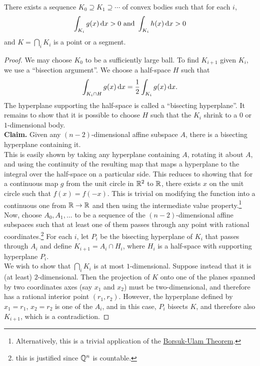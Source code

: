 \begin{lemma}
\label{localization lemma lemma 1}
	There exists a sequence $K_0\supseteq K_1 \supseteq \cdots$ of convex bodies such that for each $i$,
	\[ \int_{K_i} g(x)\operatorname{d}\!{x} > 0 \text{ and } \int_{K_i} h(x)\operatorname{d}\!{x} > 0 \]
	and $K=\bigcap_i K_i$ is a point or a segment.
\end{lemma}
\begin{proof}
	We may choose $K_0$ to be a sufficiently large ball. To find $K_{i+1}$ given $K_i$, we use a ``bisection argument''. We choose a half-space $H$ such that
	\[ \int_{K_i\cap H} g(x)\operatorname{d}\!{x} = \frac{1}{2} \int_{K_i} g(x)\operatorname{d}\!{x}. \]
	The hyperplane supporting the half-space is called a ``bisecting hyperplane''. It remains to show that it is possible to choose $H$ such that the $K_i$ shrink to a $0$ or $1$-dimensional body.\\

	\textbf{Claim.} Given any $(n-2)$-dimensional affine subspace $A$, there is a bisecting hyperplane containing it.\\
	This is easily shown by taking any hyperplane containing $A$, rotating it about $A$, and using the continuity of the resulting map that maps a hyperplane to the integral over the half-space on a particular side. This reduces to showing that for a continuous map $g$ from the unit circle in $\mathbb{R}^2$ to $\mathbb{R}$, there exists $x$ on the unit circle such that $f(x)=f(-x)$. This is trivial on modifying the function into a continuous one from $\mathbb{R}\to\mathbb{R}$ and then using the intermediate value property.\footnote{Alternatively, this is a trivial application of the \href{https://en.wikipedia.org/wiki/Borsuk-Ulam_theorem}{Borsuk-Ulam Theorem}.}\\

	Now, choose $A_0,A_1,\ldots$ to be a sequence of the $(n-2)$-dimensional affine subspaces such that at least one of them passes through any point with rational coordinates.\footnote{this is justified since $\mathbb{Q}^n$ is countable.} For each $i$, let $P_i$ be the bisecting hyperplane of $K_i$ that passes through $A_i$ and define $K_{i+1}=A_i\cap H_i$, where $H_i$ is a half-space with supporting hyperplane $P_i$.\\
	We wish to show that $\bigcap_i K_i$ is at most $1$-dimensional. Suppose instead that it is (at least) $2$-dimensional. Then the projection of $K$ onto one of the planes spanned by two coordinates axes (say $x_1$ and $x_2$) must be two-dimensional, and therefore has a rational interior point $(r_1,r_2)$. However, the hyperplane defined by $x_1=r_1$, $x_2=r_2$ is one of the $A_i$, and in this case, $P_i$ bisects $K$, and therefore also $K_{i+1}$, which is a contradiction.
\end{proof}

